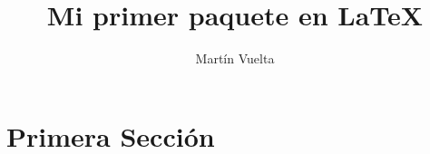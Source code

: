 \documentclass[12pt]{mydoctype}
\begin{document}
  \title{Mi primer paquete en \LaTeX}
  \author{Martín Vuelta}
  \maketitle

  \section{Primera Sección}
    \lipsum[1]
\end{document}
